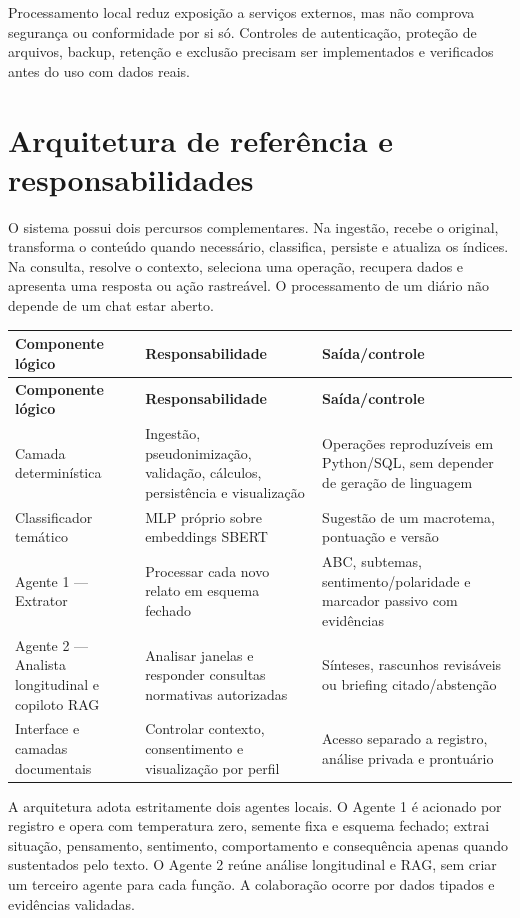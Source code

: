 \documentclass[11pt,a4paper]{article}
\begin{document}
\endgroup
Processamento local reduz exposição a serviços externos, mas não comprova segurança ou conformidade por si só. Controles de autenticação, proteção de arquivos, backup, retenção e exclusão precisam ser implementados e verificados antes do uso com dados reais.

\section{Arquitetura de referência e responsabilidades}
O sistema possui dois percursos complementares. Na ingestão, recebe o original, transforma o conteúdo quando necessário, classifica, persiste e atualiza os índices. Na consulta, resolve o contexto, seleciona uma operação, recupera dados e apresenta uma resposta ou ação rastreável. O processamento de um diário não depende de um chat estar aberto.

\begingroup\small
\begin{longtable}{>{\raggedright\arraybackslash}p{}>{\raggedright\arraybackslash}p{}>{\raggedright\arraybackslash}p{}}
\toprule
\textbf{Componente lógico} & \textbf{Responsabilidade} & \textbf{Saída/controle} \\ \midrule\endfirsthead
\toprule
\textbf{Componente lógico} & \textbf{Responsabilidade} & \textbf{Saída/controle} \\ \midrule\endhead
\bottomrule\endfoot
Camada determinística & Ingestão, pseudonimização, validação, cálculos, persistência e visualização & Operações reproduzíveis em Python/SQL, sem depender de geração de linguagem \\[3pt]
Classificador temático & MLP próprio sobre embeddings SBERT & Sugestão de um macrotema, pontuação e versão \\[3pt]
Agente 1 — Extrator & Processar cada novo relato em esquema fechado & ABC, subtemas, sentimento/polaridade e marcador passivo com evidências \\[3pt]
Agente 2 — Analista longitudinal e copiloto RAG & Analisar janelas e responder consultas normativas autorizadas & Sínteses, rascunhos revisáveis ou briefing citado/abstenção \\[3pt]
Interface e camadas documentais & Controlar contexto, consentimento e visualização por perfil & Acesso separado a registro, análise privada e prontuário \\[3pt]
\end{longtable}
\endgroup
A arquitetura adota estritamente dois agentes locais. O Agente 1 é acionado por registro e opera com temperatura zero, semente fixa e esquema fechado; extrai situação, pensamento, sentimento, comportamento e consequência apenas quando sustentados pelo texto. O Agente 2 reúne análise longitudinal e RAG, sem criar um terceiro agente para cada função. A colaboração ocorre por dados tipados e evidências validadas.
\end{document}
